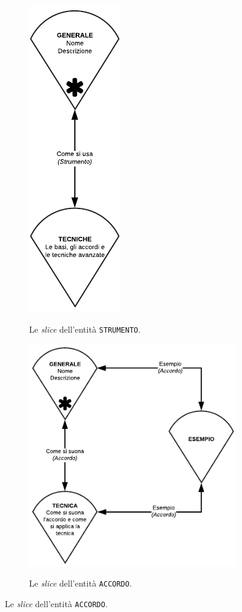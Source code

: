 \begin{figure}[H]
	\begin{subfigure}[t]{.33\textwidth}
		\centering
		\includegraphics[scale=1]{modello_rmm/slice_strumento}
		\label{fig:slice:strumento}
		\caption{Le \emph{slice} dell'entità \texttt{STRUMENTO}.}
	\end{subfigure}%
	\begin{subfigure}[t]{.66\textwidth}
		\centering
		\includegraphics[scale=1]{modello_rmm/slice_accordo}
		\label{fig:slice:accordo}
		\caption{Le \emph{slice} dell'entità \texttt{ACCORDO}.}
	\end{subfigure}
\end{figure}
